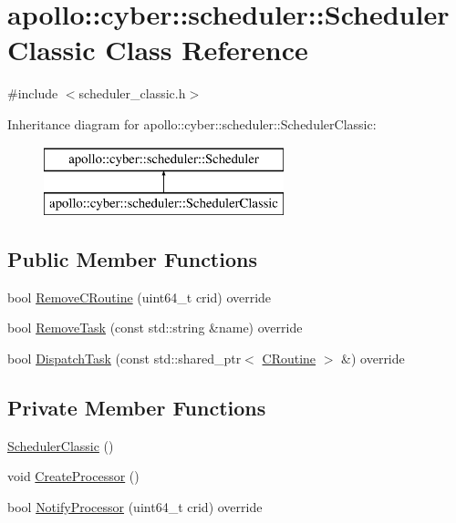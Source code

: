 \hypertarget{classapollo_1_1cyber_1_1scheduler_1_1SchedulerClassic}{\section{apollo\-:\-:cyber\-:\-:scheduler\-:\-:Scheduler\-Classic Class Reference}
\label{classapollo_1_1cyber_1_1scheduler_1_1SchedulerClassic}
}


{\ttfamily \#include $<$scheduler\-\_\-classic.\-h$>$}

Inheritance diagram for apollo\-:\-:cyber\-:\-:scheduler\-:\-:Scheduler\-Classic\-:\begin{figure}[H]
\begin{center}
\leavevmode
\includegraphics[height=2.000000cm]{classapollo_1_1cyber_1_1scheduler_1_1SchedulerClassic}
\end{center}
\end{figure}
\subsection*{Public Member Functions}
\begin{DoxyCompactItemize}
\item 
bool \hyperlink{classapollo_1_1cyber_1_1scheduler_1_1SchedulerClassic_a36977cfac2337a44dc4eca5126f2e690}{Remove\-C\-Routine} (uint64\-\_\-t crid) override
\item 
bool \hyperlink{classapollo_1_1cyber_1_1scheduler_1_1SchedulerClassic_a2988b835fccbbe8bc55b08cc1d90c5a6}{Remove\-Task} (const std\-::string \&name) override
\item 
bool \hyperlink{classapollo_1_1cyber_1_1scheduler_1_1SchedulerClassic_a83d92042c58df50cbfe52d70dbd72e36}{Dispatch\-Task} (const std\-::shared\-\_\-ptr$<$ \hyperlink{classapollo_1_1cyber_1_1croutine_1_1CRoutine}{C\-Routine} $>$ \&) override
\end{DoxyCompactItemize}
\subsection*{Private Member Functions}
\begin{DoxyCompactItemize}
\item 
\hyperlink{classapollo_1_1cyber_1_1scheduler_1_1SchedulerClassic_a065fbff2c20da2d3679134a97a363b1c}{Scheduler\-Classic} ()
\item 
void \hyperlink{classapollo_1_1cyber_1_1scheduler_1_1SchedulerClassic_a5dff717e036c226ef39a50e5cc5c8b56}{Create\-Processor} ()
\item 
bool \hyperlink{classapollo_1_1cyber_1_1scheduler_1_1SchedulerClassic_aa6b90709d9b5cc4228a4cade6e22cada}{Notify\-Processor} (uint64\-\_\-t crid) override
\end{DoxyCompactItemize}
